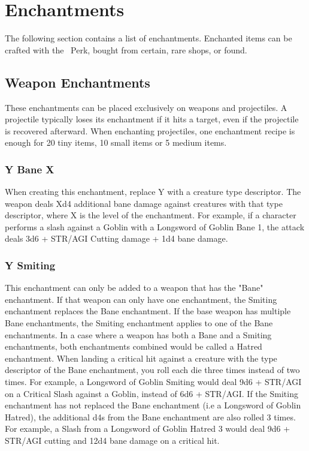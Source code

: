\section{Enchantments}\label{sec:enchantments}
The following section contains a list of enchantments.
Enchanted items can be crafted with the~ Perk, bought from certain, rare shops, or found.

\subsection{Weapon Enchantments}\label{subsec:enchantmentsWeapons}
These enchantments can be placed exclusively on weapons and projectiles.
A projectile typically loses its enchantment if it hits a target, even if the projectile is recovered afterward.
When enchanting projectiles, one enchantment recipe is enough for 20 tiny items, 10 small items or 5 medium items.

\subsubsection{Y Bane X}\label{enchantment:Bane}
When creating this enchantment, replace Y with a creature type descriptor.
The weapon deals Xd4 additional bane damage against creatures with that type descriptor, where X is the level of the enchantment.
For example, if a character performs a slash against a Goblin with a Longsword of Goblin Bane 1, the attack deals 3d6 + STR/AGI Cutting damage + 1d4 bane damage.

\subsubsection{Y Smiting}\label{enchantment:Smiting}
This enchantment can only be added to a weapon that has the "Bane" enchantment.
If that weapon can only have one enchantment, the Smiting enchantment replaces the Bane enchantment.
If the base weapon has multiple Bane enchantments, the Smiting enchantment applies to one of the Bane enchantments.
In a case where a weapon has both a Bane and a Smiting enchantments, both enchantments combined would be called a Hatred enchantment.
When landing a critical hit against a creature with the type descriptor of the Bane enchantment, you roll each die three times instead of two times.
For example, a Longsword of Goblin Smiting would deal 9d6 + STR/AGI on a Critical Slash against a Goblin, instead of 6d6 + STR/AGI.
If the Smiting enchantment has not replaced the Bane enchantment (i.e a Longsword of Goblin Hatred), the additional d4s from the Bane enchantment are also rolled 3 times.
For example, a Slash from a Longsword of Goblin Hatred 3 would deal 9d6 + STR/AGI cutting and 12d4 bane damage on a critical hit.

